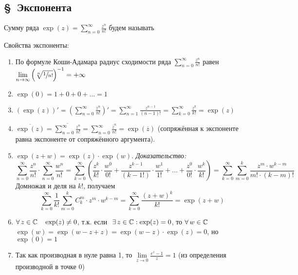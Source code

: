 \subsection*{\S\ Экспонента}

\begin{opr} 
	Сумму ряда $\displaystyle \exp(z) = \sum_{n = 0}^{\infty} \frac{z^n}{n!}$ будем называть 
\end{opr}

Свойства экспоненты:
\begin{enumerate}
	\item По формуле Коши-Адамара радиус сходимости ряда $\sum\limits_{n = 0}^{\infty} \frac{z^n}{n!}$ равен $\lim\limits_{n \to \infty} \left(\sqrt[n]{\sfrac{1}{n!}}\right)^{-1} = +\infty$
	
	\item $\exp(0) = 1 + 0 + 0 + \ldots = 1$
	
	\item $(\exp(z))' = \left(\sum\limits_{n = 0}^{\infty} \frac{z^n}{n!}\right)' = \sum\limits_{n = 1}^{\infty} \frac{z^{n - 1}}{(n - 1)!} = \sum\limits_{k = 0}^{\infty} \frac{z^k}{k!} = \exp(z)$
	
	\item $\overline{\exp(z)} = \overline {\sum\limits_{n = 0}^{\infty} \frac{z^n}{n!}} = \sum\limits_{n = 0}^{\infty} \frac{\overline z^n}{n!} = \exp(\overline z)$ (сопряжённая к экспоненте равна экспоненте от сопряжённого аргумента).
	
	\item $\exp(z + w) = \exp(z) \cdot \exp (w)$. \textit{Доказательство:}
	\[\sum_{n = 0}^{\infty} \frac {z^n}{n!} \cdot \sum_{n = 0}^{\infty} \frac {w^n}{n!} = \sum_{k = 0}^{\infty}\left(\frac{z^k}{k!} \cdot \frac{w^0}{0!} + \frac{z^{k - 1}}{(k - 1!)} \cdot \frac{w^1}{1!} + \ldots +\frac{z^0}{0!} \cdot \frac{w^k}{k!}  \right) = \sum_{k = 0}^{\infty}\sum_{m = 0}^{k} \frac{z^m \cdot w^{k - m}}{m! \cdot (k - m)!}\]
	Домножая и деля на $k!$, получаем
	\[\sum_{k = 0}^{\infty}\frac{1}{k!}\sum_{m = 0}^{k} C_k^m \cdot z^m \cdot w^{k - m} = \sum_{k = 0}^{\infty} \frac{(z + w)^k}{k!} = \exp(z + w)\]
	
	\item $\forall \, z \in \mathbb{C} \quad \exp(z) \ne 0$, т.к. если$\E z \in \cc : \exp(z) = 0$, то $\forall \, w \in \mathbb{C}$ $\exp(w) = \exp (w - z + z) = \exp(w - z) \cdot \exp(z) = 0$, но $\exp(0) = 1$
	
	\item Так как производная в нуле равна 1, то $\lim\limits_{z \to 0} \frac {e^z - 1}{z} = 1$ (из определения производной в точке 0)
\end{enumerate}

